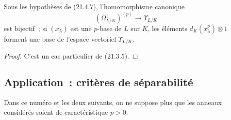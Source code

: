 \begin{proposition}[21.4.8]
\label{0.21.4.8-fr}
Sous les hypothèses de (21.4.7), l'homomorphisme canonique
\begin{equation}
\tag{21.4.8.1}\label{0.21.4.8.1-fr}
(\Omega^1_{L/K})^{(p)}\longrightarrow\Upsilon_{L/K}
\end{equation}
est bijectif~; si $(x_\lambda)$ est une $p$-base de $L$ sur $K$, les éléments
$d_K(x_\lambda^p)\otimes1$ forment une base de l'espace vectoriel $\Upsilon_{L/K}$.
\end{proposition}
\begin{proof}
C'est un cas particulier de (21.3.5).
\end{proof}

\subsection{Application~: critères de séparabilité}
\label{0.21.5-fr}

Dans ce numéro et les deux suivants, on ne suppose plus que les anneaux
considérés soient de caractéristique $p>0$.

